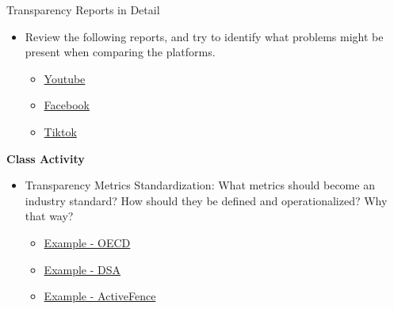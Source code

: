\documentclass[nobackground,dvipsnames,table]{beamer}
\begin{document}
\begin{frame}{Transparency Reports in Detail}

\begin{itemize}
    \item Review the following reports, and try to identify what problems might be present when comparing the platforms.

    \begin{itemize}
        \item \href{https://transparencyreport.google.com/youtube-policy/removals?hl=en}{Youtube}
        \item \href{https://transparency.fb.com/data/community-standards-enforcement/}{Facebook}
        \item \href{https://www.tiktok.com/transparency/en/community-guidelines-enforcement-2022-3/}{Tiktok}
    \end{itemize}
\end{itemize}

\textbf{Class Activity}

\begin{itemize}
    \item Transparency Metrics Standardization: What metrics should become an industry standard? How should they be defined and operationalized? Why that way?

    \begin{itemize}
        \item \href{https://www.oecd-vtrf-pilot.org/reports}{Example - OECD}
        \item \href{https://digitalservicesact.cc/dsa/art13.html}{Example  - DSA}
        \item \href{https://docs.google.com/presentation/d/1aWLOVkQQ7YD2dIxrFSF6EF8-t60SwwBj449ytxLITiQ/edit\#slide=id.g16bf9025cd7_0_82}{Example - ActiveFence}
    \end{itemize}
\end{itemize}
\end{frame}
\end{document}
